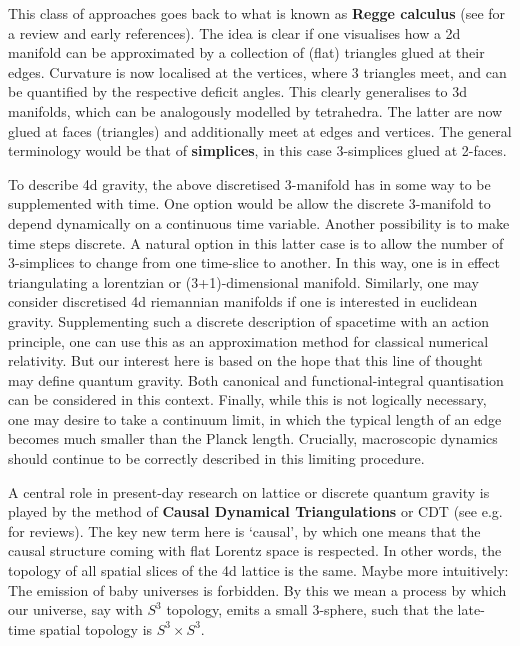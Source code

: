 \documentclass[12pt]{article}
\numberwithin{equation}{section}
\begin{document}
This class of approaches goes back to what is known as {\bf Regge calculus} \cite{Regge:1961px} (see \cite{Williams:1991cd} for a review and early references). The idea is clear if one visualises how a 2d manifold can be approximated by a collection of (flat) triangles glued at their edges. Curvature is now localised at the vertices, where 3 triangles meet, and can be quantified by the respective deficit angles. This clearly generalises to 3d manifolds, which can be analogously modelled by tetrahedra. The latter are now glued at faces (triangles) and additionally meet at edges and vertices. The general terminology would be that of {\bf simplices}, in this case 3-simplices glued at 2-faces.

To describe 4d gravity, the above discretised 3-manifold has in some way to be supplemented with time. One option would be allow the discrete 3-manifold to depend dynamically on a continuous time variable. Another possibility is to make time steps discrete. A natural option in this latter case is to allow the number of 3-simplices to change from one time-slice to another. In this way, one is in effect triangulating a lorentzian or (3+1)-dimensional manifold. Similarly, one may consider discretised 4d riemannian manifolds if one is interested in euclidean gravity. Supplementing such a discrete description of spacetime with an action principle, one can use this as an approximation method for classical numerical relativity. But our interest here is based on the hope that this line of thought may define quantum gravity. Both canonical and functional-integral quantisation can be considered in this context. Finally, while this is not logically necessary, one may desire to take a continuum limit, in which the typical length of an edge becomes much smaller than the Planck length. Crucially, macroscopic dynamics should continue to be correctly described in this limiting procedure.

A central role in present-day research on lattice or discrete quantum gravity is played by the method of {\bf Causal Dynamical Triangulations} or CDT \cite{Ambjorn:1998xu} (see e.g.~\cite{Loll:2019rdj, Ambjorn:2012jv} for reviews). The key new term here is `causal', by which one means that the causal structure coming with flat Lorentz space is respected. In other words, the topology of all spatial slices of the 4d lattice is the same. Maybe more intuitively: The emission of baby universes is forbidden. By this we mean a process by which our universe, say with $S^3$ topology, emits a small 3-sphere, such that the late-time
spatial topology is $S^3\times S^3$. 
\end{document}

